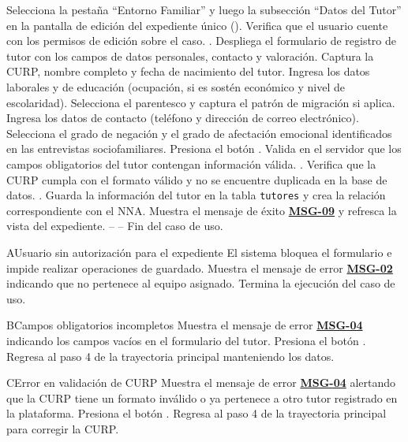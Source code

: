 \begin{UCtrayectoria}
	\UCpaso[\UCactor] Selecciona la pestaña ``Entorno Familiar'' y luego la subsección ``Datos del Tutor'' en la pantalla de edición del expediente único ().
	\UCpaso Verifica que el usuario cuente con los permisos de edición sobre el caso. .
	\UCpaso Despliega el formulario de registro de tutor con los campos de datos personales, contacto y valoración.
	\UCpaso[\UCactor] Captura la CURP, nombre completo y fecha de nacimiento del tutor.
	\UCpaso[\UCactor] Ingresa los datos laborales y de educación (ocupación, si es sostén económico y nivel de escolaridad).
	\UCpaso[\UCactor] Selecciona el parentesco y captura el patrón de migración si aplica.
	\UCpaso[\UCactor] Ingresa los datos de contacto (teléfono y dirección de correo electrónico).
	\UCpaso[\UCactor] Selecciona el grado de negación y el grado de afectación emocional identificados en las entrevistas sociofamiliares.
	\UCpaso[\UCactor] Presiona el botón .
	\UCpaso Valida en el servidor que los campos obligatorios del tutor contengan información válida. .
	\UCpaso Verifica que la CURP cumpla con el formato válido y no se encuentre duplicada en la base de datos. .
	\UCpaso Guarda la información del tutor en la tabla \texttt{tutores} y crea la relación correspondiente con el NNA.
	\UCpaso Muestra el mensaje de éxito \hyperlink{mMSG09}{\bf MSG-09} y refresca la vista del expediente.
	\UCpaso[] -- -- Fin del caso de uso.
\end{UCtrayectoria}

\begin{UCtrayectoriaA}{A}{Usuario sin autorización para el expediente}
	\UCpaso El sistema bloquea el formulario e impide realizar operaciones de guardado.
	\UCpaso Muestra el mensaje de error \hyperlink{mMSG02}{\bf MSG-02} indicando que no pertenece al equipo asignado.
	\UCpaso Termina la ejecución del caso de uso.
\end{UCtrayectoriaA}

\begin{UCtrayectoriaA}{B}{Campos obligatorios incompletos}
	\UCpaso Muestra el mensaje de error \hyperlink{mMSG04}{\bf MSG-04} indicando los campos vacíos en el formulario del tutor.
	\UCpaso[\UCactor] Presiona el botón .
	\UCpaso Regresa al paso 4 de la trayectoria principal manteniendo los datos.
\end{UCtrayectoriaA}

\begin{UCtrayectoriaA}{C}{Error en validación de CURP}
	\UCpaso Muestra el mensaje de error \hyperlink{mMSG04}{\bf MSG-04} alertando que la CURP tiene un formato inválido o ya pertenece a otro tutor registrado en la plataforma.
	\UCpaso[\UCactor] Presiona el botón .
	\UCpaso Regresa al paso 4 de la trayectoria principal para corregir la CURP.
\end{UCtrayectoriaA}
